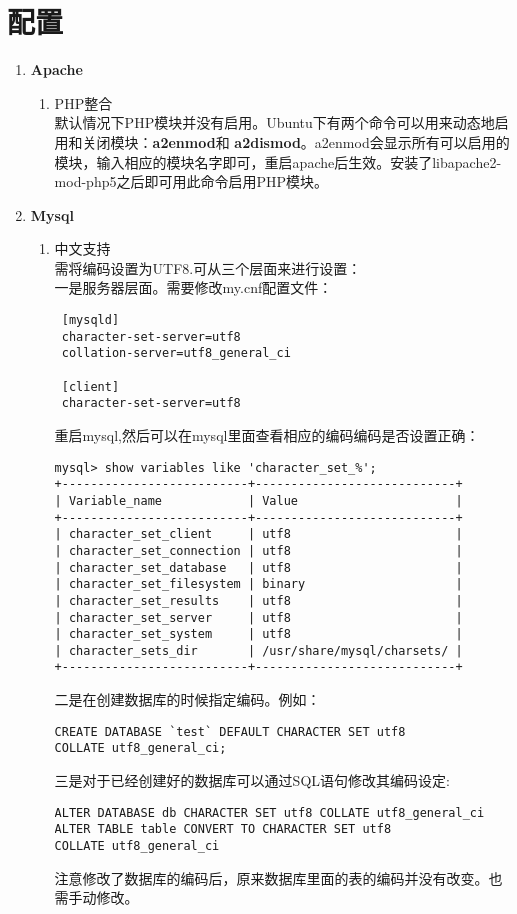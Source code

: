 \documentclass[11pt]{article}
\begin{document}
\section{配置}
\begin{enumerate}

\item \textbf{Apache}
\begin{enumerate}
\item PHP整合 \\
默认情况下PHP模块并没有启用。Ubuntu下有两个命令可以用来动态地启用和关闭模块：\textbf{a2enmod}和
\textbf{a2dismod}。a2enmod会显示所有可以启用的模块，输入相应的模块名字即可，重启apache后生效。安装了libapache2-mod-php5之后即可用此命令启用PHP模块。
\end{enumerate}

\item \textbf{Mysql}
\begin{enumerate}
\item 中文支持 \\
需将编码设置为UTF8.可从三个层面来进行设置：\\
一是服务器层面。需要修改my.cnf配置文件：\\
\begin{lstlisting}
 [mysqld] 
 character-set-server=utf8
 collation-server=utf8_general_ci 
 
 [client]
 character-set-server=utf8
\end{lstlisting}
 
重启mysql,然后可以在mysql里面查看相应的编码编码是否设置正确：\\
\begin{lstlisting}
mysql> show variables like 'character_set_%';
+--------------------------+----------------------------+
| Variable_name            | Value                      |
+--------------------------+----------------------------+
| character_set_client     | utf8                       |
| character_set_connection | utf8                       |
| character_set_database   | utf8                       |
| character_set_filesystem | binary                     |
| character_set_results    | utf8                       |
| character_set_server     | utf8                       |
| character_set_system     | utf8                       |
| character_sets_dir       | /usr/share/mysql/charsets/ |
+--------------------------+----------------------------+
\end{lstlisting}
二是在创建数据库的时候指定编码。例如：
\begin{lstlisting}
CREATE DATABASE `test` DEFAULT CHARACTER SET utf8 
COLLATE utf8_general_ci;
\end{lstlisting}
三是对于已经创建好的数据库可以通过SQL语句修改其编码设定:\\
\begin{lstlisting}
ALTER DATABASE db CHARACTER SET utf8 COLLATE utf8_general_ci
ALTER TABLE table CONVERT TO CHARACTER SET utf8 
COLLATE utf8_general_ci
\end{lstlisting}
注意修改了数据库的编码后，原来数据库里面的表的编码并没有改变。也需手动修改。
\end{enumerate}


\end{enumerate}
\end{document}
